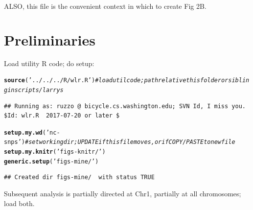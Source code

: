 \documentclass{article}\usepackage[]{graphicx}\usepackage[]{color}
\makeatletter
\newcommand{\hlstr}[1]{\textcolor[rgb]{0.192,0.494,0.8}{#1}}%
\newcommand{\hlcom}[1]{\textcolor[rgb]{0.678,0.584,0.686}{\textit{#1}}}%
\newcommand{\hlstd}[1]{\textcolor[rgb]{0.345,0.345,0.345}{#1}}%
\newcommand{\hlkwd}[1]{\textcolor[rgb]{0.737,0.353,0.396}{\textbf{#1}}}%
\newenvironment{kframe}{%
 \def\at@end@of@kframe{}%
 \ifinner\ifhmode%
  \def\at@end@of@kframe{\end{minipage}}%
  \begin{minipage}{\columnwidth}%
 \fi\fi%
 \def\FrameCommand##1{\hskip\@totalleftmargin \hskip-\fboxsep
 \colorbox{shadecolor}{##1}\hskip-\fboxsep
     \hskip-\linewidth \hskip-\@totalleftmargin \hskip\columnwidth}%
 \MakeFramed {\advance\hsize-\width
   \@totalleftmargin\z@ \linewidth\hsize
   \@setminipage}}%
 {\par\unskip\endMakeFramed%
 \at@end@of@kframe}
\newenvironment{knitrout}{}{} %
\makeatother
\begin{document}
ALSO, this file is the convenient context in which to create Fig 2B.

\section{Preliminaries}
Load utility R code; do setup:

\begin{knitrout}\footnotesize
{}\color{fgcolor}\begin{kframe}
\begin{alltt}
\hlkwd{source}\hlstd{(}\hlstr{'../../../R/wlr.R'}\hlstd{)} \hlcom{# load util code; path relative this folder or sibling in scripts/larrys }
\end{alltt}
\begin{verbatim}
## Running as: ruzzo @ bicycle.cs.washington.edu; SVN Id, I miss you.  $Id: wlr.R  2017-07-20 or later $
\end{verbatim}
\begin{alltt}
\hlkwd{setup.my.wd}\hlstd{(}\hlstr{'nc-snps'}\hlstd{)}     \hlcom{# set working dir; UPDATE if this file moves, or if COPY/PASTE to new file}
\hlkwd{setup.my.knitr}\hlstd{(}\hlstr{'figs-knitr/'}\hlstd{)}
\hlkwd{generic.setup}\hlstd{(}\hlstr{'figs-mine/'}\hlstd{)}
\end{alltt}
\begin{verbatim}
## Created dir figs-mine/  with status TRUE
\end{verbatim}
\end{kframe}
\end{knitrout}

Subsequent analysis is partially directed at Chr1, partially at all chromosomes; load both.
\end{document}

